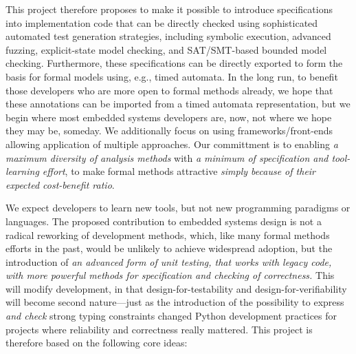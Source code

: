 This project therefore proposes to make it possible to introduce specifications into implementation code that can be directly checked using sophisticated automated test generation strategies, including symbolic execution, advanced fuzzing, explicit-state model checking, and SAT/SMT-based bounded model checking.   Furthermore, these specifications can be directly exported to form the basis for formal models using, e.g., timed automata.  In the long run, to benefit those developers who are more open to formal methods already, we hope that these annotations can be imported from a timed automata representation, but we begin where most embedded systems developers are, now, not where we hope they may be, someday.
We additionally focus on using frameworks/front-ends allowing application of multiple approaches.  Our committment is to enabling \emph{a maximum diversity of analysis methods} with \emph{a minimum of specification and tool-learning effort}, to make formal methods attractive \emph{simply because of their expected cost-benefit ratio}.

We expect developers to learn new tools, but not new programming paradigms or languages.  The proposed contribution to embedded systems design is not a radical reworking of development methods, which, like many formal methods efforts in the past, would be unlikely to achieve widespread adoption, but the introduction of \emph{an advanced form of unit testing, that works with legacy code, with more powerful methods for specification and checking of correctness.}  This will modify development, in that design-for-testability and design-for-verifiability will become second nature---just as the introduction of the possibility to express \emph{and check} strong typing constraints changed Python development practices for projects where reliability and correctness really mattered.  This project is therefore based on the following core ideas:

